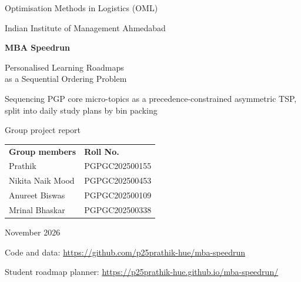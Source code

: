 \documentclass[11pt,a4paper]{article}
\newcommand{\groupmembers}{%
  Prathik          & PGPGC202500155 \\
  Nikita Naik Mood & PGPGC202500453 \\
  Anureet Biswas   & PGPGC202500109 \\
  Mrinal Bhaskar   & PGPGC202500338 \\}
\newcommand{\repourl}{\url{https://github.com/p25prathik-hue/mba-speedrun}}
\newcommand{\siteurl}{\url{https://p25prathik-hue.github.io/mba-speedrun/}}
\renewcommand{\arraystretch}{1.15}
\begin{document}
\begin{titlepage}
\centering
\vspace*{1.2cm}
{\large Optimisation Methods in Logistics (OML)\par}
{\large Indian Institute of Management Ahmedabad\par}
\vspace{2.2cm}
{\Huge\bfseries MBA Speedrun\par}
\vspace{0.4cm}
{\LARGE Personalised Learning Roadmaps\\[2pt] as a Sequential Ordering Problem\par}
\vspace{1.0cm}
{\large Sequencing PGP core micro-topics as a precedence-constrained asymmetric TSP,\\ split into daily study plans by bin packing\par}
\vspace{2.4cm}
{\large Group project report\par}
\vspace{0.8cm}
{\large
\renewcommand{\arraystretch}{1.25}
\begin{tabular}{ll}
\textbf{Group members} & \textbf{Roll No.} \\[2pt]
\groupmembers
\end{tabular}\par}
\vfill
{\large November 2026\par}
\vspace{0.3cm}
{\small Code and data: \repourl\par}
{\small Student roadmap planner: \siteurl\par}
\end{titlepage}
\end{document}
